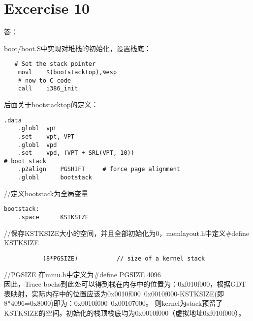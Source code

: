 \documentclass{article}
\begin{document}
\section{Excercise 10}
\begin{Large}答：\end{Large}
boot/boot.S中实现对堆栈的初始化，设置栈底：
\begin{verbatim}
   # Set the stack pointer
	movl	$(bootstacktop),%esp
	# now to C code
	call	i386_init
\end{verbatim}
后面关于bootstacktop的定义：
\begin{verbatim}
.data
	.globl	vpt
	.set	vpt, VPT
	.globl	vpd
	.set	vpd, (VPT + SRL(VPT, 10))
# boot stack
	.p2align	PGSHIFT		# force page alignment
	.globl		bootstack
\end{verbatim}
      //定义bootstack为全局变量
\begin{verbatim}
bootstack:
	.space		KSTKSIZE
\end{verbatim}
    //保存KSTKSIZE大小的空间，并且全部初始化为0，memlayout.h中定义\#define KSTKSIZE	
\begin{verbatim}
           (8*PGSIZE)   		// size of a kernel stack
\end{verbatim}
//PGSIZE 在mmu.h中定义为\#define PGSIZE		4096\\
因此，Trace bochs到此处可以得到栈在内存中的位置为：0xf010f000，根据GDT表映射，实际内存中的位置应该为0x0010f000~0x0010f000-KSTKSIZE(即8*4096=0x8000)即为：0x0010f000~0x00107000。
则kernel为stack预留了KSTKSIZE的空间。初始化的栈顶栈底均为0x0010f000（虚拟地址0xf010f000）。
\end{document}
